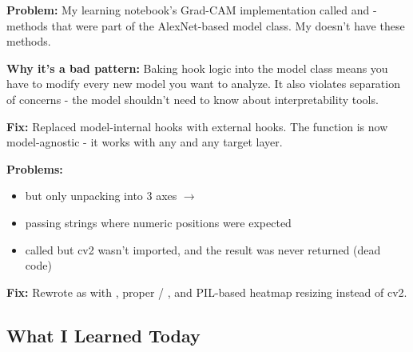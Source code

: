 \documentclass[9pt,a4paper,twocolumn,twoside]{tau-class/tau}
\begin{document}
        \begin{tauenv}[frametitle={Issue: Porting Grad-CAM from Learning Notebook}]
            \textbf{Problem:} My learning notebook's Grad-CAM implementation called  and  - methods that were part of the AlexNet-based model class. My  doesn't have these methods.

            \textbf{Why it's a bad pattern:} Baking hook logic into the model class means you have to modify every new model you want to analyze. It also violates separation of concerns - the model shouldn't need to know about interpretability tools.

            \textbf{Fix:} Replaced model-internal hooks with external hooks. The  function is now model-agnostic - it works with any  and any target layer.
        \end{tauenv}

        \begin{tauenv}[frametitle={Issue: plot\_heatmap Had Multiple Bugs}]
            \textbf{Problems:}
            \begin{itemize}
                \item {} but only unpacking into 3 axes $\rightarrow$ 
                \item {} passing strings where numeric positions were expected
                \item {} called but cv2 wasn't imported, and the result was never returned (dead code)
            \end{itemize}

            \textbf{Fix:} Rewrote as  with , proper  / , and PIL-based heatmap resizing instead of cv2.
        \end{tauenv}

    \subsection{What I Learned Today}
\end{document}
